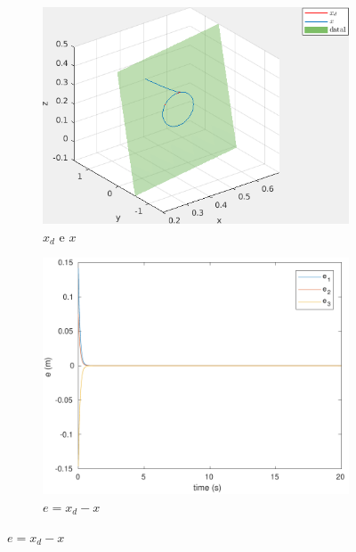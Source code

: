 \documentclass[a4paper,11pt]{article}
\theoremstyle{mytheor}
\begin{document}
\begin{figure}[!ht]
\centering
  \begin{minipage}{\linewidth}
  \centering
    \begin{subfigure}[b]{0.4\textwidth}
    \includegraphics[width=1\textwidth]{figs/ex1_c_1_x.png}
    \caption{$x_d$ e $x$}
    \label{fig:ex1_c_1_x}
    \end{subfigure}
  \end{minipage}
  \begin{minipage}{\linewidth}
  \centering
    \begin{subfigure}[b]{0.4\textwidth}
    \includegraphics[width=1\textwidth]{figs/ex1_c_1_e.pdf}
    \caption{$e = x_d - x$}
    \label{fig:ex1_c_1_e}
    \end{subfigure}

\end{minipage}
\end{figure}
\end{document}
